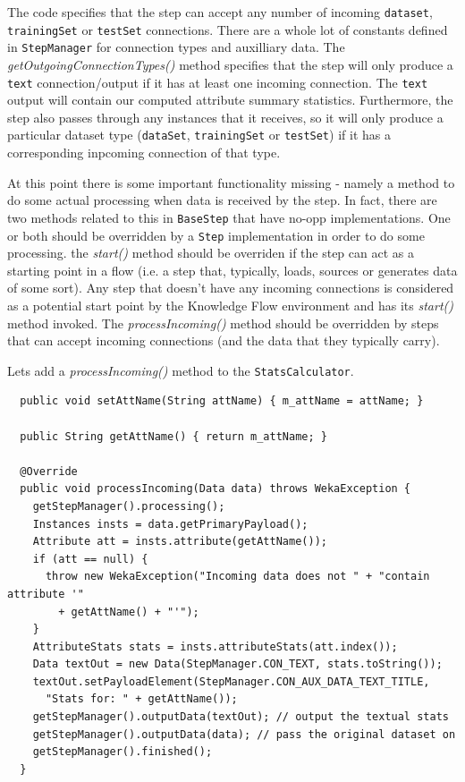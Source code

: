 The code specifies that the step can accept any number of incoming
\texttt{dataset}, \texttt{trainingSet} or \texttt{testSet}
connections. There are a whole lot of constants defined in
\texttt{StepManager} for connection types and auxilliary data. The
\textit{getOutgoingConnectionTypes()} method specifies that the step
will only produce a \texttt{text} connection/output if it has at least
one incoming connection. The \texttt{text} output will contain our
computed attribute summary statistics. Furthermore, the step also
passes through any instances that it receives, so it will only produce
a particular dataset type (\texttt{dataSet}, \texttt{trainingSet} or
\texttt{testSet}) if it has a corresponding inpcoming connection of
that type.

At this point there is some important functionality missing - namely a
method to do some actual processing when data is received by the
step. In fact, there are two methods related to this in
\texttt{BaseStep} that have no-opp implementations. One or both should
be overridden by a \verb=Step= implementation in order to do some
processing. the \textit{start()} method should be overriden if the
step can act as a starting point in a flow (i.e. a step that,
typically, loads, sources or generates data of some sort). Any step
that doesn't have any incoming connections is considered as a
potential start point by the Knowledge Flow environment and has its
\textit{start()} method invoked. The \textit{processIncoming()} method
should be overridden by steps that can accept incoming connections
(and the data that they typically carry).

Lets add a \textit{processIncoming()} method to the \verb=StatsCalculator=.

\begin{verbatim}
  public void setAttName(String attName) { m_attName = attName; }

  public String getAttName() { return m_attName; }

  @Override
  public void processIncoming(Data data) throws WekaException {
    getStepManager().processing();
    Instances insts = data.getPrimaryPayload();
    Attribute att = insts.attribute(getAttName());
    if (att == null) {
      throw new WekaException("Incoming data does not " + "contain attribute '"
        + getAttName() + "'");
    }
    AttributeStats stats = insts.attributeStats(att.index());
    Data textOut = new Data(StepManager.CON_TEXT, stats.toString());
    textOut.setPayloadElement(StepManager.CON_AUX_DATA_TEXT_TITLE,
      "Stats for: " + getAttName());
    getStepManager().outputData(textOut); // output the textual stats
    getStepManager().outputData(data); // pass the original dataset on
    getStepManager().finished();
  }
\end{verbatim}

